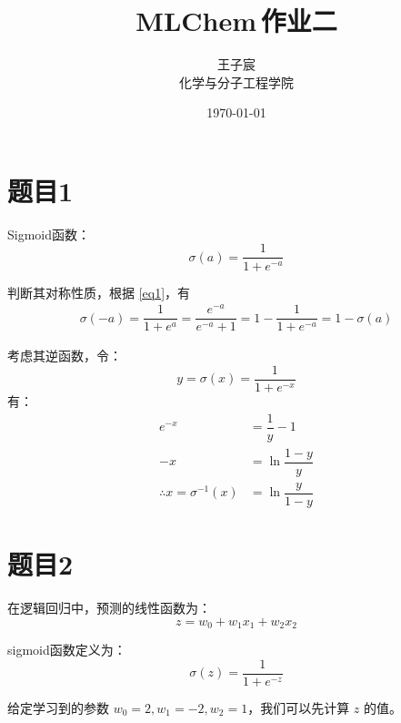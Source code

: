\documentclass{article}
\title{\huge{\textbf{MLChem\,作业二}}}
\author{\kaishu 2100011873 王子宸\\
        \kaishu 化学与分子工程学院}
\date{\kaishu \today}
\begin{document}
\maketitle

\section{题目1}

Sigmoid函数：
\begin{equation}\label{eq1}
    \sigma(a) = \dfrac{1}{1+e^{-a}}
\end{equation}

判断其对称性质，根据 \eqref{eq1}，有
\begin{align*}
    \sigma(-a) = \dfrac{1}{1+e^{a}} = \dfrac{e^{-a}}{e^{-a}+1} = 1 - \dfrac{1}{1+e^{-a}} = 1 - \sigma(a)
\end{align*}

考虑其逆函数，令：
\begin{equation*}
    y = \sigma(x) = \dfrac{1}{1+e^{-x}}
\end{equation*}
有：
\begin{align*}
    e^{-x} &= \dfrac{1}{y} - 1\\
    -x &= \ln\dfrac{1-y}{y}\\
    \therefore x = \sigma^{-1}(x) &= \ln\dfrac{y}{1-y}
\end{align*}

\section{题目2}

在逻辑回归中，预测的线性函数为：
\begin{equation}
z = w_0 + w_1x_1 + w_2x_2
\end{equation}

sigmoid函数定义为：
\begin{equation}
\sigma(z) = \dfrac{1}{1 + e^{-z}}
\end{equation}

给定学习到的参数 $w_0=2, w_1=-2, w_2=1$，我们可以先计算 $z$ 的值。
\end{document}
